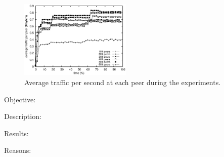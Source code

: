 \ \\

\begin{figure}
  \centering
  \includegraphics[width=0.475\textwidth]{./img/traffic.eps}
  \caption{\label{fig:traffic} Average traffic per second at each peer
    during the experiments.}
\end{figure}

\begin{asparadesc}
\item [Objective:]
\item [Description:]
\item [Results:]
\item [Reasons:]
\end{asparadesc}


